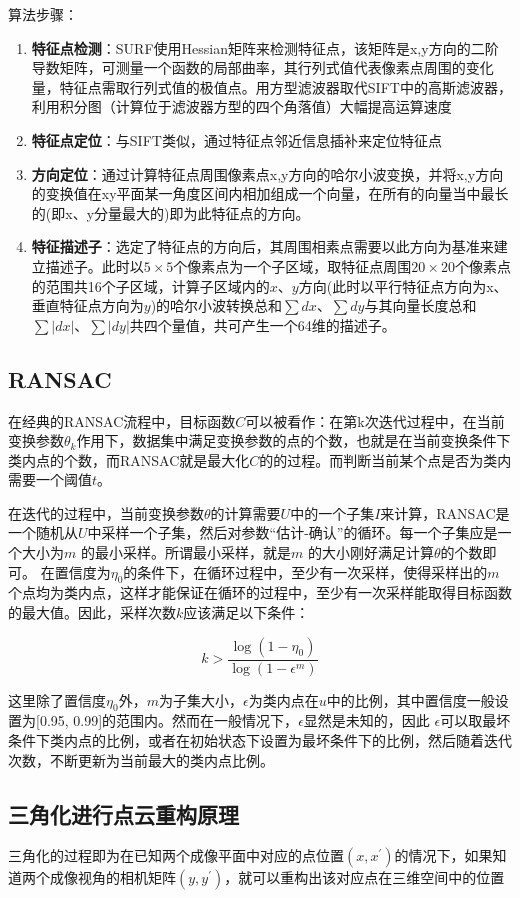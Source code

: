 算法步骤：
\begin{enumerate}
    \item \textbf{特征点检测}：SURF使用Hessian矩阵来检测特征点，该矩阵是x,y方向的二阶导数矩阵，可测量一个函数的局部曲率，其行列式值代表像素点周围的变化量，特征点需取行列式值的极值点。用方型滤波器取代SIFT中的高斯滤波器，利用积分图（计算位于滤波器方型的四个角落值）大幅提高运算速度
    \item \textbf{特征点定位}：与SIFT类似，通过特征点邻近信息插补来定位特征点
    \item \textbf{方向定位}：通过计算特征点周围像素点x,y方向的哈尔小波变换，并将x,y方向的变换值在xy平面某一角度区间内相加组成一个向量，在所有的向量当中最长的(即x、y分量最大的)即为此特征点的方向。
    \item \textbf{特征描述子}：选定了特征点的方向后，其周围相素点需要以此方向为基准来建立描述子。此时以$5\times5$个像素点为一个子区域，取特征点周围$20\times20$个像素点的范围共16个子区域，计算子区域内的$x$、$y$方向(此时以平行特征点方向为x、垂直特征点方向为$y$)的哈尔小波转换总和$\sum dx$、$\sum dy$与其向量长度总和$\sum \vert dx\vert$、$\sum\vert dy\vert$共四个量值，共可产生一个64维的描述子。
\end{enumerate}

\subsection{RANSAC}

在经典的RANSAC流程中，目标函数$C$可以被看作：在第k次迭代过程中，在当前变换参数$\theta_k$作用下，数据集中满足变换参数的点的个数，也就是在当前变换条件下类内点的个数，而RANSAC就是最大化$C$的的过程。而判断当前某个点是否为类内需要一个阈值$t$。

在迭代的过程中，当前变换参数$\theta$的计算需要$U$中的一个子集$ I $来计算，RANSAC是一个随机从$U$中采样一个子集，然后对参数“估计-确认”的循环。每一个子集应是一个大小为$m$ 的最小采样。所谓最小采样，就是$m$ 的大小刚好满足计算$\theta$的个数即可。
在置信度为$\eta_0$的条件下，在循环过程中，至少有一次采样，使得采样出的$m $个点均为类内点，这样才能保证在循环的过程中，至少有一次采样能取得目标函数的最大值。因此，采样次数$k$应该满足以下条件：

$$
    k>\frac{\log(1-\eta_0)}{\log(1-\epsilon^m)}
$$

这里除了置信度$\eta_0$外，$m $为子集大小，$\epsilon$为类内点在$u$中的比例，其中置信度一般设置为[0.95, 0.99]的范围内。然而在一般情况下，$\epsilon$显然是未知的，因此 $\epsilon$可以取最坏条件下类内点的比例，或者在初始状态下设置为最坏条件下的比例，然后随着迭代次数，不断更新为当前最大的类内点比例。

\subsection{三角化进行点云重构原理}
三角化的过程即为在已知两个成像平面中对应的点位置$(x,x^\prime)$的情况下，如果知道两个成像视角的相机矩阵$(y,y^\prime)$，就可以重构出该对应点在三维空间中的位置